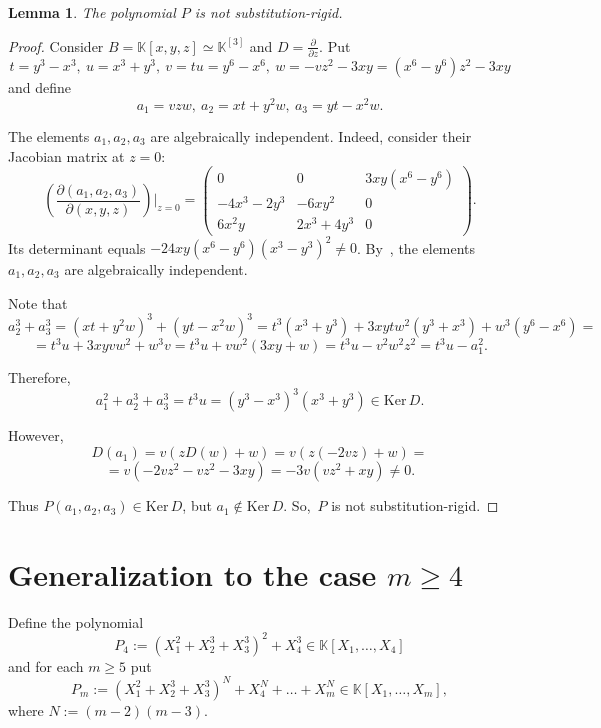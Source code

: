 \documentclass[12pt,reqno]{amsart}
\newcommand{\KK}{\mathbb K}
\newcommand{\Ker}{\mathrm{Ker}\,}
\theoremstyle{plain}
\newtheorem{lemma}{Lemma}
\theoremstyle{remark}
\theoremstyle{definition}
\begin{document}
\begin{lemma}\label{lemm=3notsr}
The polynomial $P$ is not substitution-rigid.
\end{lemma}
\begin{proof}
Consider $B=\KK[x,y,z]\simeq \KK^{[3]}$ and $D=\frac{\partial}{\partial z}$. Put 
\begin{equation}
\label{eqtuvw}
t=y^3-x^3,\ u=x^3+y^3,\ v=tu=y^6-x^6,\ w=-vz^2-3xy=(x^6-y^6)z^2-3xy
\end{equation}
and define
\begin{equation}
\label{eqa123}
    a_1=vzw,\ a_2=xt+y^2w,\ a_3=yt-x^2w.
\end{equation}

The elements $a_1,a_2,a_3$ are algebraically independent. Indeed, consider their Jacobian matrix at $z=0$: $$\left(\frac{\partial(a_1,a_2,a_3)}{\partial(x,y,z)}\right)\Bigg|_{z=0}=\begin{pmatrix}
    0 & 0 & 3xy(x^6-y^6)\\
    - 4x^3 - 2y^3&- 6xy^2 & 0\\
    6x^2y & 2x^3 + 4y^3 &0
\end{pmatrix}.$$ Its determinant equals $-24xy(x^6-y^6)(x^3-y^3)^2\neq 0$. By~\cite[Lemma 3.10 (c)]{F}, the elements $a_1,a_2,a_3$ are algebraically independent.

Note that $$a_2^3+a_3^3=(xt+y^2w)^3+(yt-x^2w)^3=t^3(x^3+y^3)+3xytw^2(y^3+x^3)+w^3(y^6-x^6)=$$
$$=t^3u+3xyvw^2+w^3v=t^3u+vw^2(3xy+w)=t^3u-v^2w^2z^2=t^3u-a_1^2.$$

Therefore, $$a_1^2+a_2^3+a_3^3=t^3u=(y^3-x^3)^3(x^3+y^3)\in \Ker  D.$$

However, $$D(a_1)=v(zD(w)+w)=v(z(-2vz)+w)= $$ $$ =v(-2vz^2-vz^2-3xy)=-3v(vz^2+xy)\neq 0.$$

Thus $P(a_1,a_2,a_3)\in\Ker D$, but $a_1\not\in\Ker D$. So,~$P$ is not substitution-rigid.
\end{proof}

\section{Generalization to the case $m\geq 4$}
\label{sectm>=4}
Define the polynomial 
\begin{equation}
\label{eqm=4}
P_4:=(X_1^2+X_2^3+X_3^3)^2+X_4^3\in\KK[X_1,\dots,X_4]
\end{equation}
and for each $m\geq 5$ put 
\begin{equation}
\label{eqm>=5}
P_m:=(X_1^2+X_2^3+X_3^3)^N+X_4^N+\dots+X_m^N\in\KK[X_1,\dots,X_m],
\end{equation}
where $N:=(m-2)(m-3)$.
\end{document}
